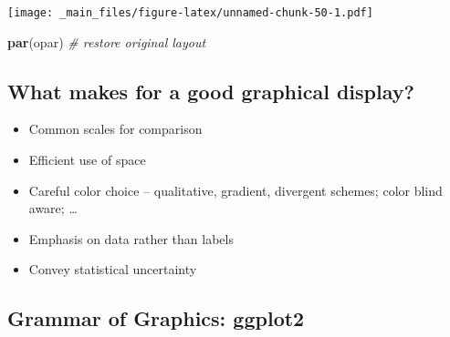 \documentclass[]{article}
\newenvironment{Shaded}{\begin{snugshade}}{\end{snugshade}}
\newcommand{\KeywordTok}[1]{\textcolor[rgb]{0.13,0.29,0.53}{\textbf{#1}}}
\newcommand{\DataTypeTok}[1]{\textcolor[rgb]{0.13,0.29,0.53}{#1}}
\newcommand{\DecValTok}[1]{\textcolor[rgb]{0.00,0.00,0.81}{#1}}
\newcommand{\StringTok}[1]{\textcolor[rgb]{0.31,0.60,0.02}{#1}}
\newcommand{\CommentTok}[1]{\textcolor[rgb]{0.56,0.35,0.01}{\textit{#1}}}
\newcommand{\OperatorTok}[1]{\textcolor[rgb]{0.81,0.36,0.00}{\textbf{#1}}}
\newcommand{\NormalTok}[1]{#1}
\providecommand{\tightlist}{%
  \setlength{\itemsep}{0pt}\setlength{\parskip}{0pt}}
\theoremstyle{definition}
\theoremstyle{definition}
\theoremstyle{remark}
\begin{document}
\begin{itemize}
\begin{Shaded}
\end{Shaded}

  \texttt{[image: \_main\_files/figure-latex/unnamed-chunk-50-1.pdf]}

\begin{Shaded}
\begin{Highlighting}[]
\KeywordTok{par}\NormalTok{(opar)                      }\CommentTok{# restore original layout}
\end{Highlighting}
\end{Shaded}
\end{itemize}

\subsection{What makes for a good graphical
display?}\label{what-makes-for-a-good-graphical-display}

\begin{itemize}
\tightlist
\item
  Common scales for comparison
\item
  Efficient use of space
\item
  Careful color choice -- qualitative, gradient, divergent schemes;
  color blind aware; \ldots{}
\item
  Emphasis on data rather than labels
\item
  Convey statistical uncertainty
\end{itemize}

\subsection{Grammar of Graphics:
ggplot2}\label{grammar-of-graphics-ggplot2}
\end{document}
